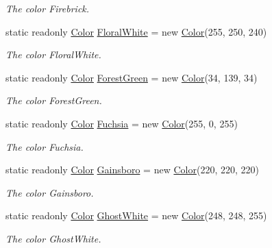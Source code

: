 \begin{DoxyCompactItemize}
\begin{DoxyCompactList}\small\item\em The color Firebrick. \end{DoxyCompactList}\item 
static readonly \hyperlink{struct_tri_devs_1_1_tri_engine2_d_1_1_color}{Color} \hyperlink{struct_tri_devs_1_1_tri_engine2_d_1_1_color_a6ae1c909867eb636b122bb522e4ea695}{Floral\-White} = new \hyperlink{struct_tri_devs_1_1_tri_engine2_d_1_1_color}{Color}(255, 250, 240)
\begin{DoxyCompactList}\small\item\em The color Floral\-White. \end{DoxyCompactList}\item 
static readonly \hyperlink{struct_tri_devs_1_1_tri_engine2_d_1_1_color}{Color} \hyperlink{struct_tri_devs_1_1_tri_engine2_d_1_1_color_a2551a5837f3ded4fee9d9508c1f797bc}{Forest\-Green} = new \hyperlink{struct_tri_devs_1_1_tri_engine2_d_1_1_color}{Color}(34, 139, 34)
\begin{DoxyCompactList}\small\item\em The color Forest\-Green. \end{DoxyCompactList}\item 
static readonly \hyperlink{struct_tri_devs_1_1_tri_engine2_d_1_1_color}{Color} \hyperlink{struct_tri_devs_1_1_tri_engine2_d_1_1_color_a2f2c02d21a08bd08d0079599f6740675}{Fuchsia} = new \hyperlink{struct_tri_devs_1_1_tri_engine2_d_1_1_color}{Color}(255, 0, 255)
\begin{DoxyCompactList}\small\item\em The color Fuchsia. \end{DoxyCompactList}\item 
static readonly \hyperlink{struct_tri_devs_1_1_tri_engine2_d_1_1_color}{Color} \hyperlink{struct_tri_devs_1_1_tri_engine2_d_1_1_color_a06b361380cf8a0503f99b63ad1fcb3ee}{Gainsboro} = new \hyperlink{struct_tri_devs_1_1_tri_engine2_d_1_1_color}{Color}(220, 220, 220)
\begin{DoxyCompactList}\small\item\em The color Gainsboro. \end{DoxyCompactList}\item 
static readonly \hyperlink{struct_tri_devs_1_1_tri_engine2_d_1_1_color}{Color} \hyperlink{struct_tri_devs_1_1_tri_engine2_d_1_1_color_a7621c27221a8b6c8870ec5112a28a3e6}{Ghost\-White} = new \hyperlink{struct_tri_devs_1_1_tri_engine2_d_1_1_color}{Color}(248, 248, 255)
\begin{DoxyCompactList}\small\item\em The color Ghost\-White. \end{DoxyCompactList}\item 

\end{DoxyCompactItemize}
